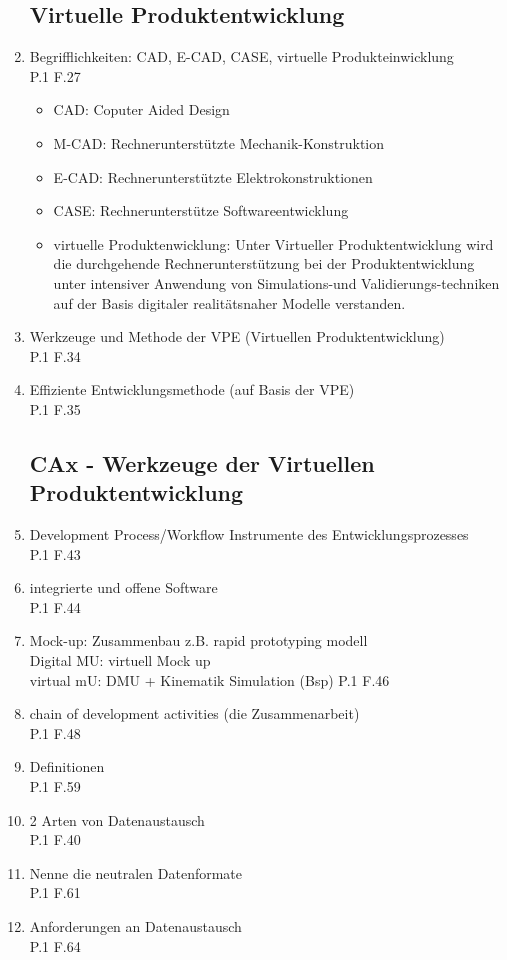 \documentclass[10pt,a4paper,fleqn]{article}
\begin{document}
\begin{enumerate}
\subsection{Virtuelle Produktentwicklung}
\item Begrifflichkeiten: CAD, E-CAD, CASE, virtuelle Produkteinwicklung\\
	P.1 F.27\\
		\begin{itemize}
			\item CAD: Coputer Aided Design
			\item M-CAD: Rechnerunterstützte Mechanik-Konstruktion
			\item E-CAD: Rechnerunterstützte Elektrokonstruktionen
			\item CASE: Rechnerunterstütze Softwareentwicklung
			\item virtuelle Produktenwicklung: Unter Virtueller Produktentwicklung wird die durchgehende Rechnerunterstützung bei
der Produktentwicklung unter intensiver Anwendung von Simulations-und Validierungs-techniken auf der Basis digitaler realitätsnaher Modelle verstanden.
		\end{itemize}
\item Werkzeuge und Methode der VPE (Virtuellen Produktentwicklung)\\
	P.1 F.34
\item Effiziente Entwicklungsmethode (auf Basis der VPE)\\
	P.1 F.35
\subsection{CAx - Werkzeuge der Virtuellen Produktentwicklung}
\item Development Process/Workflow Instrumente des Entwicklungsprozesses\\
	P.1 F.43
\item integrierte und offene Software\\
	P.1 F.44
\item Mock-up: Zusammenbau z.B. rapid prototyping modell\\
	Digital MU: virtuell Mock up\\
	virtual mU: DMU + Kinematik Simulation (Bsp)
	P.1 F.46
\item chain of development activities (die Zusammenarbeit)\\
	P.1 F.48
\item Definitionen\\
	P.1 F.59
\item 2 Arten von Datenaustausch\\
	P.1 F.40
\item Nenne die neutralen Datenformate\\
	P.1 F.61
\item Anforderungen an Datenaustausch\\
	P.1 F.64

\end{enumerate}
\end{document}
